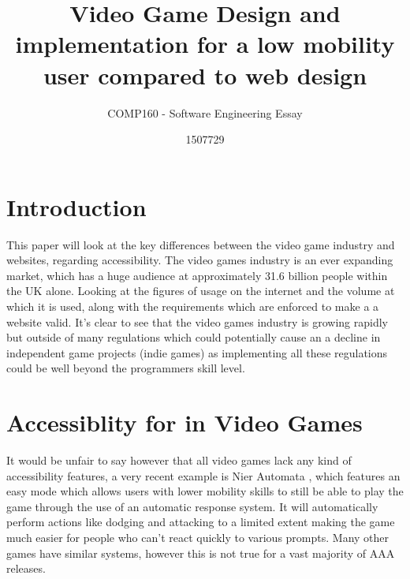 \documentclass{scrartcl}
\title{Video Game Design and implementation for a low mobility user compared to web design}
\subtitle{COMP160 - Software Engineering Essay}
\author{1507729}
\begin{document}
\maketitle



\section{Introduction}

This paper will look at the key differences between the video game industry and websites, regarding accessibility. The video games industry is an ever expanding market, which has a huge audience at approximately 31.6 billion people within the UK alone. \cite{UKIE2017Games} Looking at the figures of usage on the internet and the volume at which it is used, along with the requirements which are enforced to make a a website valid. \cite{world2017internet} \cite{caldwell2008web} It's clear to see that the video games industry is growing rapidly but outside of many regulations which could potentially cause an a decline in independent game projects (indie games) as implementing all these regulations could be well beyond the programmers skill level.

\section{Accessiblity for in Video Games}

It would be unfair to say however that all video games lack any kind of accessibility features, a very recent example is Nier Automata \cite{Platinum2017Nier}, which features an easy mode which allows users with lower mobility skills to still be able to play the game through the use of an automatic response system. It will automatically perform actions like dodging and attacking to a limited extent making the game much easier for people who can't react quickly to various prompts. Many other games have similar systems, however this is not true for a vast majority of AAA releases. 
\end{document}

